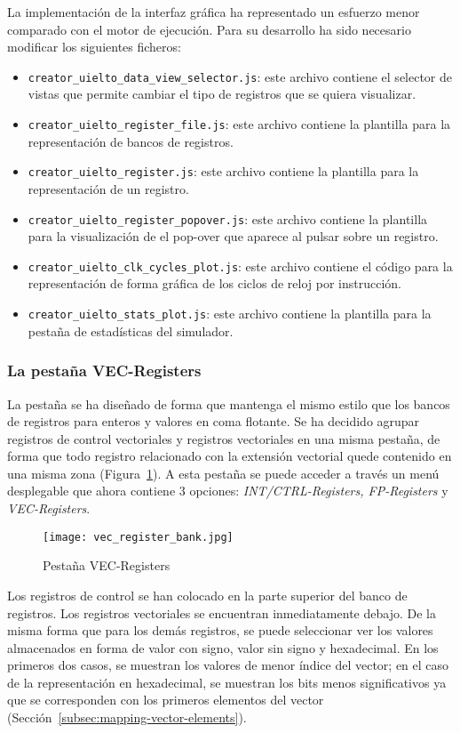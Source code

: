 La implementación de la interfaz gráfica ha representado un esfuerzo menor comparado con el motor de ejecución. Para su desarrollo ha sido necesario modificar los siguientes ficheros:
\begin{itemize}
    \item \texttt{creator\_uielto\_data\_view\_selector.js}: este archivo contiene el selector de vistas que permite cambiar el tipo de registros que se quiera visualizar.
    \item \texttt{creator\_uielto\_register\_file.js}: este archivo contiene la plantilla para la representación de bancos de registros.
    \item \texttt{creator\_uielto\_register.js}: este archivo contiene la plantilla para la representación de un registro.
    \item \texttt{creator\_uielto\_register\_popover.js}: este archivo contiene la plantilla para la visualización de el pop-over que aparece al pulsar sobre un registro.
    \item \texttt{creator\_uielto\_clk\_cycles\_plot.js}: este archivo contiene el código para la representación de forma gráfica de los ciclos de reloj por instrucción.
    \item \texttt{creator\_uielto\_stats\_plot.js}: este archivo contiene la plantilla para la pestaña de estadísticas del simulador.
\end{itemize}

\subsubsection{La pestaña VEC-Registers}
La pestaña se ha diseñado de forma que mantenga el mismo estilo que los bancos de registros para enteros y valores en coma flotante. Se ha decidido agrupar registros de control vectoriales y registros vectoriales en una misma pestaña, de forma que todo registro relacionado con la extensión vectorial quede contenido en una misma zona (Figura~\ref{fig:register-bank}). A esta pestaña se puede acceder a través un menú desplegable que ahora contiene 3 opciones: \textit{INT/CTRL-Registers, FP-Registers} y \textit{VEC-Registers}.

\begin{figure}[H]
    \texttt{[image: vec\_register\_bank.jpg]}
    \caption{Pestaña VEC-Registers}\label{fig:register-bank}
\end{figure}

Los registros de control se han colocado en la parte superior del banco de registros. Los registros vectoriales se encuentran inmediatamente debajo. De la misma forma que para los demás registros, se puede seleccionar ver los valores almacenados en forma de valor con signo, valor sin signo y hexadecimal. En los primeros dos casos, se muestran los valores de menor índice del vector; en el caso de la representación en hexadecimal, se muestran los bits menos significativos ya que se corresponden con los primeros elementos del vector (Sección~\ref{subsec:mapping-vector-elements}).

